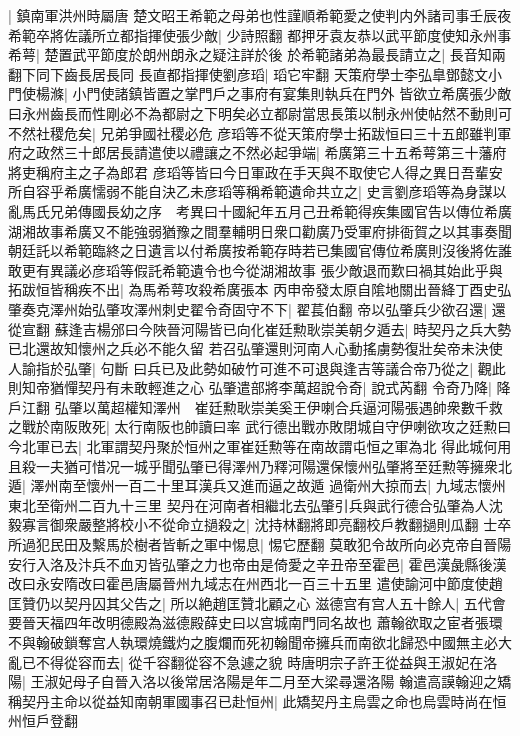 |{
	鎮南軍洪州時屬唐}
楚文昭王希範之母弟也性謹順希範愛之使判内外諸司事壬辰夜希範卒將佐議所立都指揮使張少敵|{
	少詩照翻}
都押牙袁友恭以武平節度使知永州事希萼|{
	楚置武平節度於朗州朗永之疑注詳於後}
於希範諸弟為最長請立之|{
	長音知兩翻下同下齒長居長同}
長直都指揮使劉彦瑫|{
	瑫它牢翻}
天策府學士李弘臯鄧懿文小門使楊滌|{
	小門使諸鎮皆置之掌門戶之事府有宴集則執兵在門外}
皆欲立希廣張少敵曰永州齒長而性剛必不為都尉之下明矣必立都尉當思長策以制永州使帖然不動則可不然社稷危矣|{
	兄弟爭國社稷必危}
彦瑫等不從天策府學士拓跋恒曰三十五郎雖判軍府之政然三十郎居長請遣使以禮讓之不然必起爭端|{
	希廣第三十五希萼第三十藩府將吏稱府主之子為郎君}
彦瑫等皆曰今日軍政在手天與不取使它人得之異日吾輩安所自容乎希廣懦弱不能自決乙未彦瑫等稱希範遺命共立之|{
	史言劉彦瑫等為身謀以亂馬氏兄弟傳國長幼之序　考異曰十國紀年五月己丑希範得疾集國官告以傳位希廣湖湘故事希廣又不能強弱猶豫之間羣輔明日衆口勸廣乃受軍府排衙賀之以其事奏聞朝廷託以希範臨終之日遺言以付希廣按希範存時若已集國官傳位希廣則沒後將佐誰敢更有異議必彦瑫等假託希範遺令也今從湖湘故事}
張少敵退而歎曰禍其始此乎與拓跋恒皆稱疾不出|{
	為馬希萼攻殺希廣張本}
丙申帝發太原自隂地關出晉絳丁酉史弘肇奏克澤州始弘肇攻澤州刺史翟令奇固守不下|{
	翟萇伯翻}
帝以弘肇兵少欲召還|{
	還從宣翻}
蘇逢吉楊邠曰今陜晉河陽皆已向化崔廷勲耿崇美朝夕遁去|{
	時契丹之兵大勢已北還故知懷州之兵必不能久留}
若召弘肇還則河南人心動搖虜勢復壯矣帝未決使人諭指於弘肇|{
	句斷}
曰兵已及此勢如破竹可進不可退與逢吉等議合帝乃從之|{
	觀此則知帝猶憚契丹有未敢輕進之心}
弘肇遣部將李萬超說令奇|{
	說式芮翻}
令奇乃降|{
	降戶江翻}
弘肇以萬超權知澤州　崔廷勲耿崇美奚王伊喇合兵逼河陽張遇帥衆數千救之戰於南阪敗死|{
	太行南阪也帥讀曰率}
武行德出戰亦敗閉城自守伊喇欲攻之廷勲曰今北軍已去|{
	北軍謂契丹聚於恒州之軍崔廷勲等在南故謂屯恒之軍為北}
得此城何用且殺一夫猶可惜况一城乎聞弘肇已得澤州乃釋河陽還保懷州弘肇將至廷勲等擁衆北遁|{
	澤州南至懷州一百二十里耳漢兵又進而逼之故遁}
過衛州大掠而去|{
	九域志懷州東北至衛州二百九十三里}
契丹在河南者相繼北去弘肇引兵與武行德合弘肇為人沈毅寡言御衆嚴整將校小不從命立撾殺之|{
	沈持林翻將即亮翻校戶教翻撾則瓜翻}
士卒所過犯民田及繫馬於樹者皆斬之軍中惕息|{
	惕它歷翻}
莫敢犯令故所向必克帝自晉陽安行入洛及汴兵不血刃皆弘肇之力也帝由是倚愛之辛丑帝至霍邑|{
	霍邑漢彘縣後漢改曰永安隋改曰霍邑唐屬晉州九域志在州西北一百三十五里}
遣使諭河中節度使趙匡贊仍以契丹囚其父告之|{
	所以絶趙匡贊北顧之心}
滋德宫有宫人五十餘人|{
	五代會要晉天福四年改明德殿為滋德殿薛史曰以宫城南門同名故也}
蕭翰欲取之宦者張環不與翰破鎖奪宫人執環燒鐵灼之腹爛而死初翰聞帝擁兵而南欲北歸恐中國無主必大亂已不得從容而去|{
	從千容翻從容不急遽之貌}
時唐明宗子許王從益與王淑妃在洛陽|{
	王淑妃母子自晉入洛以後常居洛陽是年二月至大梁尋還洛陽}
翰遣高謨翰迎之矯稱契丹主命以從益知南朝軍國事召已赴恒州|{
	此矯契丹主烏雲之命也烏雲時尚在恒州恒戶登翻}
